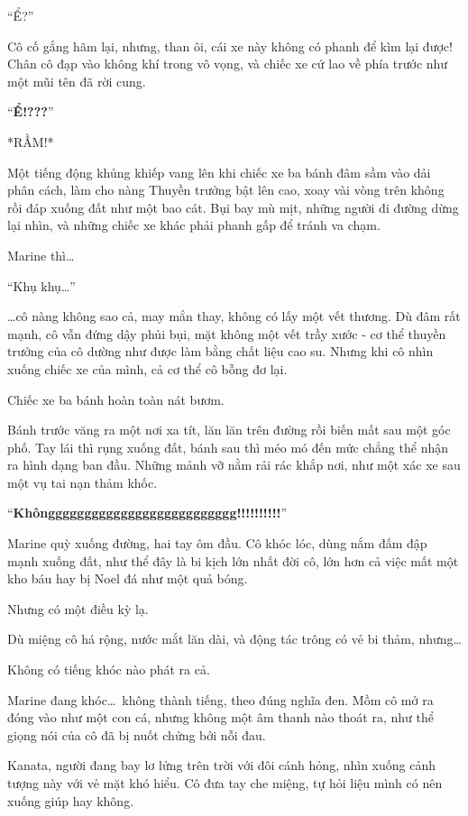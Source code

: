 \documentclass[../main.tex]{subfiles}
\begin{document}
``Ể?''

Cô cố gắng hãm lại, nhưng, than ôi, cái xe này không có phanh để kìm lại được! Chân cô đạp vào không khí trong vô vọng, và chiếc xe cứ lao về phía trước như một mũi tên đã rời cung.

``\textbf{Ể!???}''

*RẦM!*


Một tiếng động khủng khiếp vang lên khi chiếc xe ba bánh đâm sầm vào dải phân cách, làm cho nàng Thuyền trưởng bật lên cao, xoay vài vòng trên không rồi đáp xuống đất như một bao cát. Bụi bay mù mịt, những người đi đường dừng lại nhìn, và những chiếc xe khác phải phanh gấp để tránh va chạm.

Marine thì\dots

``Khụ khụ\dots''

\dots cô nàng không sao cả, may mắn thay, không có lấy một vết thương. Dù đâm rất mạnh, cô vẫn đứng dậy phủi bụi, mặt không một vết trầy xước - cơ thể thuyền trưởng của cô dường như được làm bằng chất liệu cao su. Nhưng khi cô nhìn xuống chiếc xe của mình, cả cơ thể cô bỗng đơ lại.

Chiếc xe ba bánh hoàn toàn nát bươm.

Bánh trước văng ra một nơi xa tít, lăn lăn trên đường rồi biến mất sau một góc phố. Tay lái thì rụng xuống đất, bánh sau thì méo mó đến mức chẳng thể nhận ra hình dạng ban đầu. Những mảnh vỡ nằm rải rác khắp nơi, như một xác xe sau một vụ tai nạn thảm khốc.

``\textbf{Khôngggggggggggggggggggggggggg!!!!!!!!!!}''

Marine quỳ xuống đường, hai tay ôm đầu. Cô khóc lóc, dùng nắm đấm đập mạnh xuống đất, như thể đây là bi kịch lớn nhất đời cô, lớn hơn cả việc mất một kho báu hay bị Noel đá như một quả bóng.


Nhưng có một điều kỳ lạ.

Dù miệng cô há rộng, nước mắt lăn dài, và động tác trông có vẻ bi thảm, nhưng\dots

Không có tiếng khóc nào phát ra cả.

Marine đang khóc\dots\ không thành tiếng, theo đúng nghĩa đen. Mồm cô mở ra đóng vào như một con cá, nhưng không một âm thanh nào thoát ra, như thể giọng nói của cô đã bị nuốt chửng bởi nỗi đau.

Kanata, người đang bay lơ lửng trên trời với đôi cánh hỏng, nhìn xuống cảnh tượng này với vẻ mặt khó hiểu. Cô đưa tay che miệng, tự hỏi liệu mình có nên xuống giúp hay không.
\end{document}
